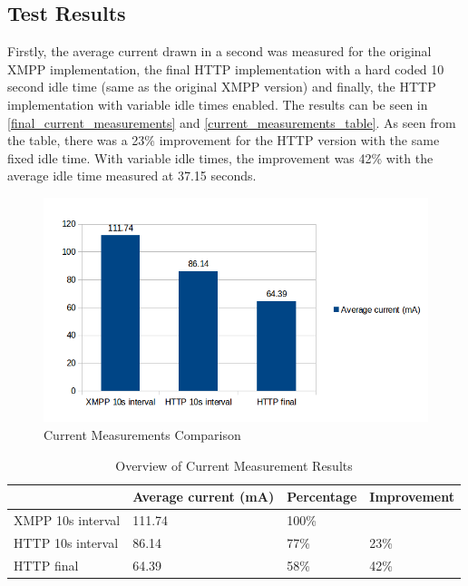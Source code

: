 \subsection{Test Results}

Firstly, the average current drawn in a second was measured for the original XMPP implementation, the final HTTP implementation with a hard coded 10 second idle time (same as the original XMPP version) and finally, the HTTP implementation with variable idle times enabled. The results can be seen in \autoref{final_current_measurements} and \autoref{current_measurements_table}. As seen from the table, there was a 23\% improvement for the HTTP version with the same fixed idle time. With variable idle times, the improvement was 42\% with the average idle time measured at 37.15 seconds. 

\begin{figure}[h!]
\centering
\includegraphics[scale=0.55]{4/figures/final_measurements.png}
\caption{Current Measurements Comparison}
\label{final_current_measurements}
\end{figure}

\begin{table}[h]
\centering
  \begin{tabular}{|l|l|l|l|}
    \hline
     & Average current (mA) & Percentage & Improvement \\ \hline
    XMPP 10s interval & 111.74 & 100\% & \\ \hline
    HTTP 10s interval & 86.14 & 77\% & 23\% \\ \hline
    HTTP final & 64.39 & 58\% & 42\% \\
    \hline
  \end{tabular}
\caption{Overview of Current Measurement Results}
\label{current_measurements_table}
\end{table}

